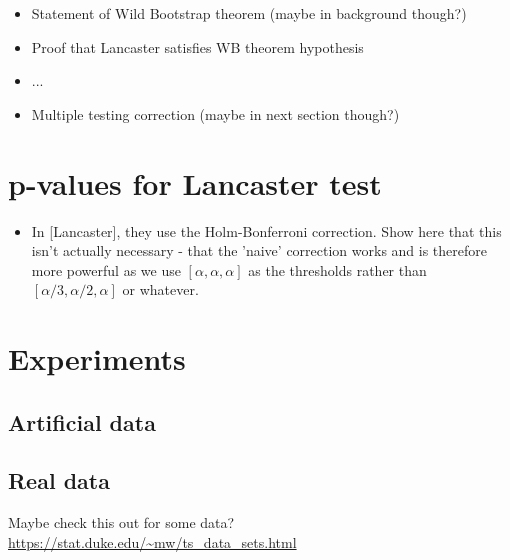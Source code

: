 \documentclass{article}
\begin{document}
\begin{itemize}
\item Statement of Wild Bootstrap theorem (maybe in background though?)
\item Proof that Lancaster satisfies WB theorem hypothesis
\item ...
\item Multiple testing correction (maybe in next section though?)
\end{itemize}

\section{p-values for Lancaster test}
\begin{itemize}
\item In [Lancaster], they use the Holm-Bonferroni correction. Show here that this isn't actually necessary - that the 'naive' correction works and is therefore more powerful as we use $[\alpha,\alpha,\alpha]$ as the thresholds rather than $[\alpha/3,\alpha/2,\alpha]$ or whatever.	
\end{itemize}


\section{Experiments}
\subsection{Artificial data}
\subsection{Real data}
Maybe check this out for some data? \url{https://stat.duke.edu/~mw/ts_data_sets.html}
\end{document}
